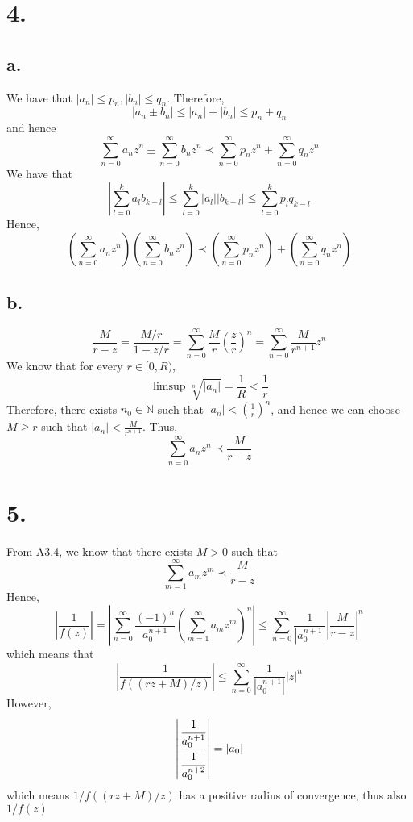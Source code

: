 \documentclass[11pt]{article}
\begin{document}
\newpage
\section*{4.}
\subsection*{a.}
We have that $|a_n| \le p_n, |b_n| \le q_n$. Therefore, 
\[
    |a_n \pm b_n| \le |a_n| + |b_n| \le p_n + q_n      
\]
and hence 
\[
    \sum_{n=0}^\infty a_n z^n \pm \sum_{n=0}^\infty b_n z^n \prec \sum_{n=0}^\infty p_n z^n + \sum_{n=0}^\infty q_n z^n     
\]
We have that 
\[
    \left|\sum_{l=0}^k a_l b_{k-l} \right| \le \sum_{l=0}^k |a_l| |b_{k-l}| \le \sum_{l=0}^k p_l q_{k-l} 
\]
Hence, 
\[
    \left(\sum_{n=0}^\infty a_n z^n \right) \left( \sum_{n=0}^\infty b_n z^n \right) \prec \left(\sum_{n=0}^\infty p_n z^n\right) + \left(\sum_{n=0}^\infty q_n z^n\right)     
\]
\subsection*{b.}
\[
    \frac{M}{r - z} = \frac{M/r}{1 - z/r} = \sum_{n=0}^\infty \frac{M}{r} \left(\frac{z}{r}\right)^n = \sum_{n=0}^\infty \frac{M}{r^{n+1}} z^n
\]
We know that for every $r \in [0,R)$, 
\[
    \limsup \sqrt[n]{|a_n|} = \frac{1}{R} < \frac{1}{r} 
\]
Therefore, there exists $n_0 \in \mathbb{N}$ such that $|a_n| < \left( \frac{1}{r} \right)^n$,
and hence we can choose $M \ge r$ such that $|a_n| < \frac{M}{r^{n+1}}$. Thus, 
\[
    \sum_{n=0}^\infty a_n z^n \prec \frac{M}{r-z}    
\]
\newpage
\section*{5.}
From A3.4, we know that there exists $M>0$ such that 
\[
    \sum_{m=1}^\infty a_m z^m \prec \frac{M}{r - z}    
\]
Hence, 
\[
    \left|\frac{1}{f(z)} \right| = \left| \sum_{n=0}^\infty \frac{(-1)^n}{a_0^{n+1}} \left( \sum_{m=1}^\infty a_m z^m \right)^n \right| \le \sum_{n=0}^\infty \frac{1}{\left| a_0^{n+1} \right|} \left| \frac{M}{r-z} \right|^n
\]
which means that
\[
    \left| \frac{1}{f((rz+M)/z)} \right| \le \sum_{n=0}^\infty \frac{1}{\left| a_0^{n+1} \right|} |z|^n
\]
However, 
\[
    \left| \frac{\cfrac{1}{a_0^{n+1}}}{\cfrac{1}{a_0^{n+2}}} \right| = |a_0|    
\]
which means $1/f((rz+M)/z)$ has a positive radius of convergence, thus also $1/f(z)$
\end{document}

